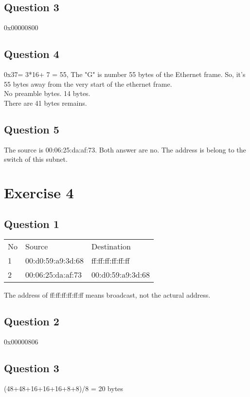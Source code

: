\documentclass{article}
\begin{document}
\subsection{Question 3}
0x00000800

\subsection{Question 4}
0x37= 3*16+ 7 = 55,
The "G" is number 55 bytes of the Ethernet frame. So, it's 55 bytes away from the very start of the ethernet frame. \\
No preamble bytes. 14 bytes. \\
There are 41 bytes remains.

\subsection{Question 5}
The source is 00:06:25:da:af:73. Both answer are no. The address is belong to the switch of this subnet.

\section{Exercise 4}

\subsection{Question 1}

\begin{tabular}{l l l}
    No & Source            & Destination       \\
    1  & 00:d0:59:a9:3d:68 & ff:ff:ff:ff:ff:ff \\
    2  & 00:06:25:da:af:73 & 00:d0:59:a9:3d:68 \\
\end{tabular}

The address of ff:ff:ff:ff:ff:ff means broadcast, not the actural address.

\subsection{Question 2}

0x00000806

\subsection{Question 3}

(48+48+16+16+16+8+8)/8 = 20 bytes
\end{document}
